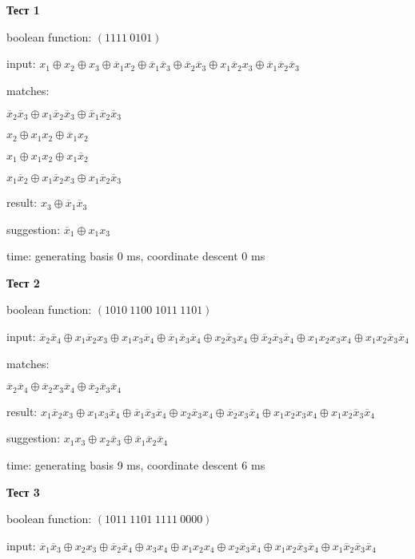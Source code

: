\documentclass[a4paper,12pt,titlepage,finall]{article}
\begin{document}
\textbf{Тест 1}

boolean function: $(1111\:0101)$

input: $x_1 \oplus x_2 \oplus x_3 \oplus \overline x_1 x_2 \oplus \overline x_1 \overline x_3 \oplus \overline x_2 \overline x_3 \oplus x_1 \overline x_2 x_3 \oplus \overline x_1 \overline x_2 \overline x_3$

matches:

$\overline x_2 \overline x_3 \oplus x_1 \overline x_2 \overline x_3 \oplus \overline x_1 \overline x_2 \overline x_3$

$x_2 \oplus x_1 x_2 \oplus \overline x_1 x_2$

$x_1 \oplus x_1 x_2 \oplus x_1 \overline x_2$

$x_1 \overline x_2 \oplus x_1 \overline x_2 x_3 \oplus x_1 \overline x_2 \overline x_3$

result: $x_3 \oplus \overline x_1 \overline x_3$

suggestion: $\overline x_1 \oplus x_1 x_3$

time: generating basis 0 ms, coordinate descent 0 ms

\textbf{Тест 2}

boolean function: $(1010\:1100\;1011\:1101)$

input: $\overline x_2 \overline x_4 \oplus x_1 \overline x_2 x_3 \oplus x_1 x_3 \overline x_4 \oplus \overline x_1 \overline x_3 \overline x_4 \oplus x_2 \overline x_3 x_4 \oplus \overline x_2 \overline x_3 \overline x_4 \oplus x_1 x_2 x_3 x_4 \oplus x_1 x_2 \overline x_3 \overline x_4$

matches:

$\overline x_2 \overline x_4 \oplus \overline x_2 x_3 \overline x_4 \oplus \overline x_2 \overline x_3 \overline x_4$

result: $x_1 \overline x_2 x_3 \oplus x_1 x_3 \overline x_4 \oplus \overline x_1 \overline x_3 \overline x_4 \oplus x_2 \overline x_3 x_4 \oplus \overline x_2 x_3 \overline x_4 \oplus x_1 x_2 x_3 x_4 \oplus x_1 x_2 \overline x_3 \overline x_4$

suggestion: $x_1 x_3 \oplus x_2 \overline x_3 \oplus \overline x_1 \overline x_2 \overline x_4$

time: generating basis 9 ms, coordinate descent 6 ms

\textbf{Тест 3}

boolean function: $(1011\:1101\;1111\:0000)$

input: $\overline x_1 \overline x_3 \oplus x_2 x_3 \oplus \overline x_2 \overline x_4 \oplus x_3 x_4 \oplus x_1 x_2 x_4 \oplus x_2 \overline x_3 \overline x_4 \oplus x_1 x_2 \overline x_3 \overline x_4 \oplus x_1 \overline x_2 \overline x_3 \overline x_4$
\end{document}
